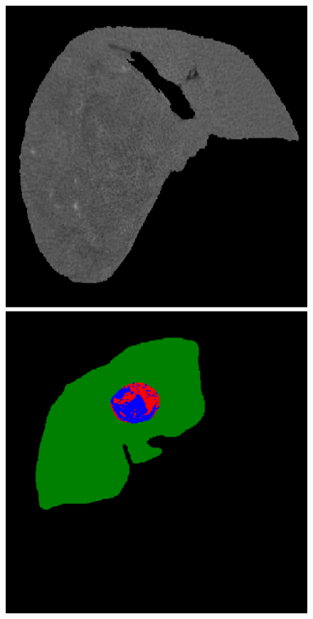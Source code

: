 \begin{figure}[!ht]
\begin{minipage}{4cm}
\end{minipage} \hspace{-0.3cm}
\begin{minipage}{4cm}
\includegraphics[width=\linewidth]{./images/5_8_orig_resized}
\end{minipage}
\vspace{-0.2cm}
\begin{minipage}{4cm}
\includegraphics[width=\linewidth]{./images/1_21_gt_resized}

\end{minipage}
\end{figure}
